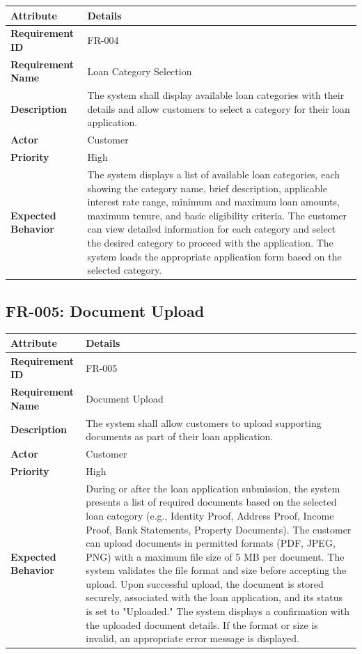 \documentclass[12pt,a4paper,oneside]{report}
\begin{document}
\begin{table}[htbp]
\centering
\small
\begin{tabularx}{\textwidth}{l l}
\toprule
\textbf{Attribute} & \textbf{Details} \\
\midrule
\textbf{Requirement ID} & FR-004 \\
\textbf{Requirement Name} & Loan Category Selection \\
\textbf{Description} & The system shall display available loan categories with their details and allow customers to select a category for their loan application. \\
\textbf{Actor} & Customer \\
\textbf{Priority} & High \\
\textbf{Expected Behavior} & The system displays a list of available loan categories, each showing the category name, brief description, applicable interest rate range, minimum and maximum loan amounts, maximum tenure, and basic eligibility criteria. The customer can view detailed information for each category and select the desired category to proceed with the application. The system loads the appropriate application form based on the selected category. \\
\bottomrule
\end{tabularx}
\end{table}

\subsection{FR-005: Document Upload}

\begin{table}[htbp]
\centering
\small
\begin{tabularx}{\textwidth}{l l}
\toprule
\textbf{Attribute} & \textbf{Details} \\
\midrule
\textbf{Requirement ID} & FR-005 \\
\textbf{Requirement Name} & Document Upload \\
\textbf{Description} & The system shall allow customers to upload supporting documents as part of their loan application. \\
\textbf{Actor} & Customer \\
\textbf{Priority} & High \\
\textbf{Expected Behavior} & During or after the loan application submission, the system presents a list of required documents based on the selected loan category (e.g., Identity Proof, Address Proof, Income Proof, Bank Statements, Property Documents). The customer can upload documents in permitted formats (PDF, JPEG, PNG) with a maximum file size of 5 MB per document. The system validates the file format and size before accepting the upload. Upon successful upload, the document is stored securely, associated with the loan application, and its status is set to "Uploaded." The system displays a confirmation with the uploaded document details. If the format or size is invalid, an appropriate error message is displayed. \\
\bottomrule
\end{tabularx}
\end{table}
\end{document}
